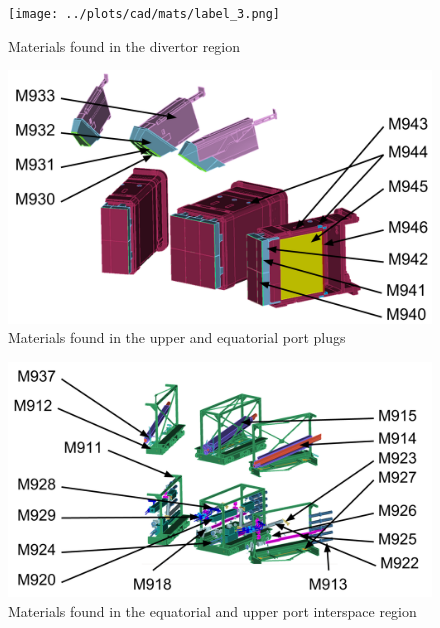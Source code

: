 \documentclass[12pt]{article}
\begin{document}
\begin{figure}[p]
  \centering
  \texttt{[image: ../plots/cad/mats/label\_3.png]}
  \caption{Materials found in the divertor region}
  \label{fig:material_assign_2}
\end{figure}

\begin{figure}[p]
  \centering
  \includegraphics[scale=0.32]{../plots/cad/mats/label_4.png}
  \caption{Materials found in the upper and equatorial port plugs }
  \label{fig:material_assign_3}
\end{figure}

\begin{figure}[p]
  \centering
  \includegraphics[scale=0.32]{../plots/cad/mats/label_5.png}
  \caption{Materials found in the equatorial and
           upper port interspace region}
  \label{fig:material_assign_4}
\end{figure}
\end{document}
